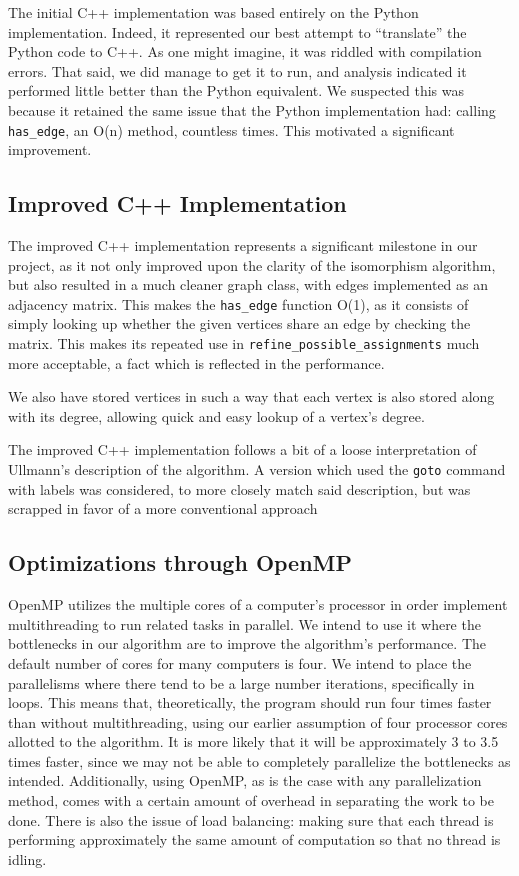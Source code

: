 \documentclass{article}
\begin{document}
  The initial C++ implementation was based entirely on the Python implementation. Indeed, it represented our best attempt to ``translate'' the Python code to C++. As one might imagine, it was riddled with compilation errors. That said, we did manage to get it to run, and analysis indicated it performed little better than the Python equivalent. We suspected this was because it retained the same issue that the Python implementation had: calling \texttt{has\_edge}, an O(n) method, countless times. This motivated a significant improvement.

  \subsection{Improved C++ Implementation}

  The improved C++ implementation represents a significant milestone in our project, as it not only improved upon the clarity of the isomorphism algorithm, but also resulted in a much cleaner graph class, with edges implemented as an adjacency matrix. This makes the \texttt{has\_edge} function O(1), as it consists of simply looking up whether the given vertices share an edge by checking the matrix. This makes its repeated use in \texttt{refine\_possible\_assignments} much more acceptable, a fact which is reflected in the performance.

  We also have stored vertices in such a way that each vertex is also stored along with its degree, allowing quick and easy lookup of a vertex's degree.

  The improved C++ implementation follows a bit of a loose interpretation of Ullmann's description of the algorithm. A version which used the \texttt{goto} command with labels was considered, to more closely match said description, but was scrapped in favor of a more conventional approach

  \subsection{Optimizations through OpenMP}
  OpenMP utilizes the multiple cores of a computer's processor in order implement multithreading to run related tasks in parallel. We intend to use it where the bottlenecks in our algorithm are to improve the algorithm's performance. The default number of cores for many computers is four. We intend to place the parallelisms where there tend to be a large number iterations, specifically in loops. This means that, theoretically, the program should run four times faster than without multithreading, using our earlier assumption of four processor cores allotted to the algorithm. It is more likely that it will be approximately 3 to 3.5 times faster, since we may not be able to completely parallelize the bottlenecks as intended. Additionally, using OpenMP, as is the case with any parallelization method, comes with a certain amount of overhead in separating the work to be done. There is also the issue of load balancing: making sure that each thread is performing approximately the same amount of computation so that no thread is idling.
\end{document}
